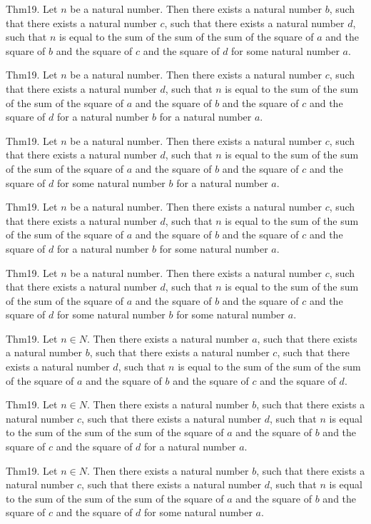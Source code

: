 \documentclass{article}
\begin{document}
Thm19. Let $n$ be a natural number. Then there exists a natural number $b$, such that there exists a natural number $c$, such that there exists a natural number $d$, such that $n$ is equal to the sum of the sum of the sum of the square of $a$ and the square of $b$ and the square of $c$ and the square of $d$ for some natural number $a$.

Thm19. Let $n$ be a natural number. Then there exists a natural number $c$, such that there exists a natural number $d$, such that $n$ is equal to the sum of the sum of the sum of the square of $a$ and the square of $b$ and the square of $c$ and the square of $d$ for a natural number $b$ for a natural number $a$.

Thm19. Let $n$ be a natural number. Then there exists a natural number $c$, such that there exists a natural number $d$, such that $n$ is equal to the sum of the sum of the sum of the square of $a$ and the square of $b$ and the square of $c$ and the square of $d$ for some natural number $b$ for a natural number $a$.

Thm19. Let $n$ be a natural number. Then there exists a natural number $c$, such that there exists a natural number $d$, such that $n$ is equal to the sum of the sum of the sum of the square of $a$ and the square of $b$ and the square of $c$ and the square of $d$ for a natural number $b$ for some natural number $a$.

Thm19. Let $n$ be a natural number. Then there exists a natural number $c$, such that there exists a natural number $d$, such that $n$ is equal to the sum of the sum of the sum of the square of $a$ and the square of $b$ and the square of $c$ and the square of $d$ for some natural number $b$ for some natural number $a$.

Thm19. Let $n \in N$. Then there exists a natural number $a$, such that there exists a natural number $b$, such that there exists a natural number $c$, such that there exists a natural number $d$, such that $n$ is equal to the sum of the sum of the sum of the square of $a$ and the square of $b$ and the square of $c$ and the square of $d$.

Thm19. Let $n \in N$. Then there exists a natural number $b$, such that there exists a natural number $c$, such that there exists a natural number $d$, such that $n$ is equal to the sum of the sum of the sum of the square of $a$ and the square of $b$ and the square of $c$ and the square of $d$ for a natural number $a$.

Thm19. Let $n \in N$. Then there exists a natural number $b$, such that there exists a natural number $c$, such that there exists a natural number $d$, such that $n$ is equal to the sum of the sum of the sum of the square of $a$ and the square of $b$ and the square of $c$ and the square of $d$ for some natural number $a$.
\end{document}
